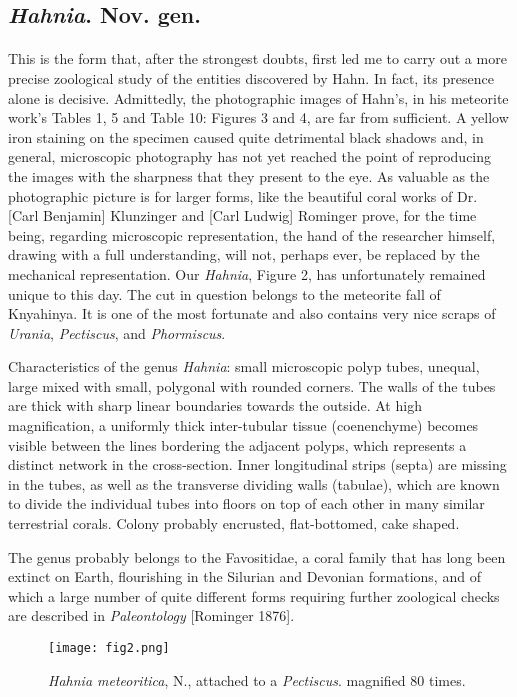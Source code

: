 \documentclass[a4paper, 12pt, oneside]{article}
\begin{document}
\subsection{\emph{Hahnia}. Nov. gen.}
\paragraph{}
This is the form that, after the strongest doubts, first led me to carry out a more precise zoological study of the entities discovered by Hahn. In fact, its presence alone is decisive. Admittedly, the photographic images of Hahn's, in his meteorite work's Tables 1, 5 and Table 10: Figures 3 and 4, are far from sufficient. A yellow iron staining on the specimen caused quite detrimental black shadows and, in general, microscopic photography has not yet reached the point of reproducing the images with the sharpness that they present to the eye. As valuable as the photographic picture is for larger forms, like the beautiful coral works of Dr. [Carl Benjamin] Klunzinger and [Carl Ludwig] Rominger prove, for the time being, regarding microscopic representation, the hand of the researcher himself, drawing with a full understanding, will not, perhaps ever, be replaced by the mechanical representation. Our \emph{Hahnia}, Figure 2, has unfortunately remained unique to this day. The cut in question belongs to the meteorite fall of Knyahinya. It is one of the most fortunate and also contains very nice scraps of \emph{Urania}, \emph{Pectiscus}, and \emph{Phormiscus}.

Characteristics of the genus \emph{Hahnia}: small microscopic polyp tubes, unequal, large mixed with small, polygonal with rounded corners. The walls of the tubes are thick with sharp linear boundaries towards the outside. At high magnification, a uniformly thick inter-tubular tissue (coenenchyme) becomes visible between the lines bordering the adjacent polyps, which represents a distinct network in the cross-section. Inner longitudinal strips (septa) are missing in the tubes, as well as the transverse dividing walls (tabulae), which are known to divide the individual tubes into floors on top of each other in many similar terrestrial corals. Colony probably encrusted, flat-bottomed, cake shaped.

The genus probably belongs to the Favositidae, a coral family that has long been extinct on Earth, flourishing in the Silurian and Devonian formations, and of which a large number of quite different forms requiring further zoological checks are described in \emph{Paleontology} [Rominger 1876].
\begin{figure}[H]
\centering
\texttt{[image: fig2.png]}
\caption{\emph{Hahnia meteoritica}, N., attached to a \emph{Pectiscus}. magnified 80 times.}
\end{figure}
\end{document}
